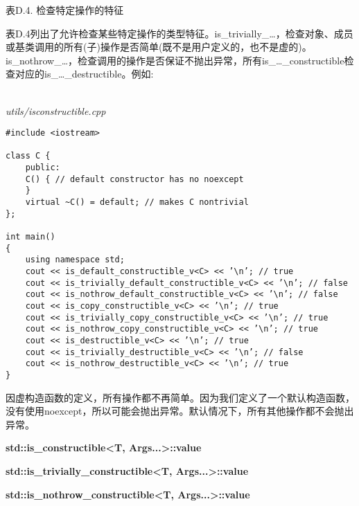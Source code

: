 \begin{center}
表D.4. 检查特定操作的特征
\end{center}

表D.4列出了允许检查某些特定操作的类型特征。is\_trivially\_…，检查对象、成员或基类调用的所有(子)操作是否简单(既不是用户定义的，也不是虚的)。is\_nothrow\_…，检查调用的操作是否保证不抛出异常，所有is\_…\_constructible检查对应的is\_…\_destructible。例如:

\hspace*{\fill} \\ %
\noindent
\textit{utils/isconstructible.cpp}
\begin{lstlisting}[style=styleCXX]
#include <iostream>

class C {
	public:
	C() { // default constructor has no noexcept
	}
	virtual ~C() = default; // makes C nontrivial
};

int main()
{
	using namespace std;
	cout << is_default_constructible_v<C> << ’\n’; // true
	cout << is_trivially_default_constructible_v<C> << ’\n’; // false
	cout << is_nothrow_default_constructible_v<C> << ’\n’; // false
	cout << is_copy_constructible_v<C> << ’\n’; // true
	cout << is_trivially_copy_constructible_v<C> << ’\n’; // true
	cout << is_nothrow_copy_constructible_v<C> << ’\n’; // true
	cout << is_destructible_v<C> << ’\n’; // true
	cout << is_trivially_destructible_v<C> << ’\n’; // false
	cout << is_nothrow_destructible_v<C> << ’\n’; // true
}
\end{lstlisting}

因虚构造函数的定义，所有操作都不再简单。因为我们定义了一个默认构造函数，没有使用noexcept，所以可能会抛出异常。默认情况下，所有其他操作都不会抛出异常。

\textbf{std::is\_constructible<T, Args...>::value}

\textbf{std::is\_trivially\_constructible<T, Args...>::value}

\textbf{std::is\_nothrow\_constructible<T, Args...>::value}

